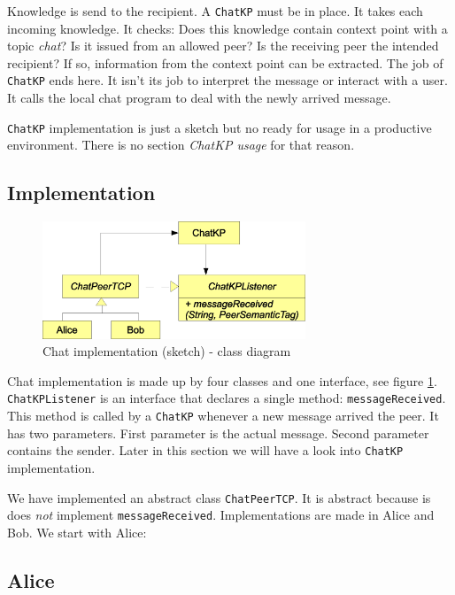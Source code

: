 {Knowledge is send to the recipient. A {\tt ChatKP} must be in place. It takes each incoming knowledge. It checks: Does this knowledge contain context point with a topic {\it chat}? Is it issued from an allowed peer? Is the receiving peer the intended recipient? If so, information from the context point can be extracted. The job of {\tt ChatKP} ends here. It isn't its job to interpret the message or interact with a user. It calls the local chat program to deal with the newly arrived message.

{\tt ChatKP} implementation is just a sketch but no ready for usage in a productive environment. There is no section {\it ChatKP usage} for that reason.

\subsection{Implementation}

\begin{figure}[t]
\centering
\includegraphics[width=0.70\textwidth]{chatClassDiagram.eps}
\caption{Chat implementation (sketch) - class diagram}
\label{fig:chatClassDiagram}
\end{figure}

Chat implementation is made up by four classes and one interface, see figure \ref{fig:chatClassDiagram}. {\tt ChatKPListener} is an interface that declares a single method: {\tt messageReceived}. This method is called by a {\tt ChatKP} whenever a new message arrived the peer. It has two parameters. First parameter is the actual message. Second parameter contains the sender. Later in this section we will have a look into {\tt ChatKP} implementation.

We have implemented an abstract class {\tt ChatPeerTCP}. It is abstract because is does {\it not} implement {\tt messageReceived}. Implementations are made in Alice and Bob. We start with Alice:

\subsection{Alice}

}
